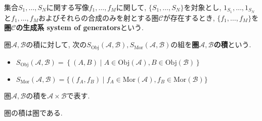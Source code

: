 \begin{comment}
\begin{proof}
\end{proof}
\end{comment}
\begin{Def}
集合$S_1,\dots,S_N$に関する写像$f_1,\dots,f_M$に関して,
$\{S_1,\dots,S_N\}$を対象とし,
$1_{S_1},\dots,1_{S_N}$と$f_1,\dots,f_M$およびそれらの合成のみを射とする圏$\mathscr{C}$が存在するとき, $\{f_1,\dots,f_M\}$を{\bf 圏$\mathscr{C}$の生成系 system of generators}という.
\end{Def}
\begin{Def}
圏$\mathscr{A},\mathscr{B}$の積に対して, 次の$S_{\mathrm{Obj}}\left(\mathscr{A},\mathscr{B}\right),S_{\mathrm{Mor}}\left(\mathscr{A},\mathscr{B}\right)$の組を{\bf 圏$\mathscr{A},\mathscr{B}$の積}という.
\begin{itemize}
\item $S_{\mathrm{Obj}}\left(\mathscr{A},\mathscr{B}\right)
=\left\{(A,B)\mid A\in\mathrm{Obj}(\mathscr{A}),B\in\mathrm{Obj}(\mathscr{B})\right\}$
\item $S_{\mathrm{Mor}}\left(\mathscr{A},\mathscr{B}\right)
=\{(f_A,f_B)\mid f_A\in\mathrm{Mor(\mathscr{A})},
f_B\in\mathrm{Mor(\mathscr{B})}\}$
\end{itemize}
\end{Def}
\begin{Def}
圏$\mathscr{A},\mathscr{B}$の積を$\mathscr{A}\times\mathscr{B}$で表す.
\end{Def}
\begin{Prop}
圏の積は圏である.
\end{Prop}

